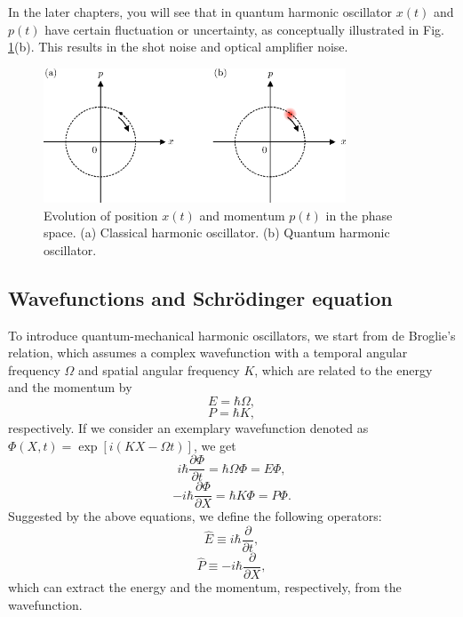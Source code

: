 In the later chapters, you will see that in quantum harmonic oscillator $x(t)$ and $p(t)$ have certain fluctuation or uncertainty, as conceptually illustrated in Fig. {\ref{fig:classical_phase_space}}(b). This results in the shot noise and optical amplifier noise.

\begin{figure}
  \centering
  \includegraphics[width=9cm]{fig/3-1_phase_space.eps} 
  \caption{Evolution of position $x(t)$ and momentum $p(t)$ in the phase space. (a) Classical harmonic oscillator. (b) Quantum harmonic oscillator. }
  \label{fig:classical_phase_space}
\end{figure}


\subsection{Wavefunctions and Schr\"odinger equation}
To introduce quantum-mechanical harmonic oscillators, we start from de Broglie's relation, which assumes a complex wavefunction with a temporal angular frequency $\Omega$ and spatial angular frequency $K$, which are related to the energy and the momentum by
\begin{equation}
  E = \hbar \Omega,
\end{equation}
\begin{equation}
  P = \hbar K,
\end{equation}
respectively. If we consider an exemplary wavefunction denoted as $\Phi(X, t)= \exp[i(KX-\Omega t)]$, we get 
\begin{equation}
 i\hbar\frac{\partial\Phi}{\partial t} = \hbar\Omega \Phi = E\Phi,
\end{equation}
\begin{equation}
-i\hbar \frac {\partial \Phi}{\partial X} = \hbar K\Phi = P\Phi.
\end{equation}
Suggested by the above equations, we define the following operators:
\begin{equation}
	\hat E \equiv i\hbar \frac{\partial}{\partial t}, 
 \label{eq:energy_operator}
\end{equation}
\begin{equation}
  \hat P \equiv -i\hbar \frac{\partial}{\partial X},
  \label{eq:momentum_operator}
\end{equation}
which can extract the energy and the momentum, respectively, from the wavefunction.

